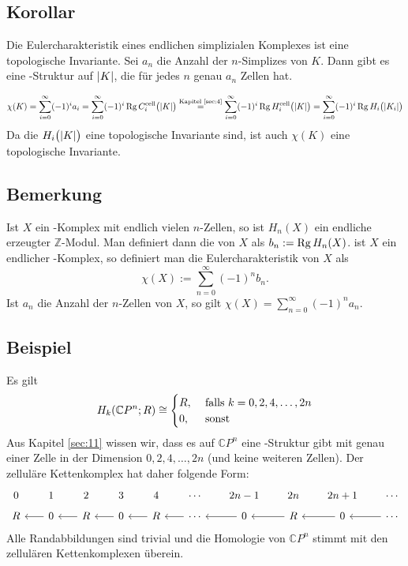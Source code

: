\subsection{Korollar} %
\label{sub:1210}
Die Eulercharakteristik eines endlichen simplizialen Komplexes ist eine topologische Invariante.
Sei $a_n$ die Anzahl der $n$-Simplizes von $K$. Dann gibt es eine \CW-Struktur auf $\abs*{K}$, die für jedes $n$ genau $a_n$ Zellen hat. 

\[
	\chi(K) = \sum_{i=0}^{\infty} (-1)^i a_i = \sum_{i=0}^{\infty} (-1)^i \Rg C_i^{\cell} \enbrace[\big]{\abs*{K}} \stackrel{\text{Kapitel \ref{sec:4}}}{=}
	\sum_{i=0}^{\infty} (-1)^i \Rg H_i^{\cell} \enbrace[\big]{\abs*{K}} = \sum_{i=0}^{\infty} (-1)^i \Rg H_i \enbrace[\big]{\abs*{K_i} }    
\]
Da die $H_i \enbrace[\big]{\abs*{K} } $ eine topologische Invariante sind, ist auch $\chi(K)$ eine topologische Invariante. \bewende

\subsection[Bemerkung: $n$-te Bettizahl]{Bemerkung} %
\label{sub:1211}
Ist $X$ ein \CW-Komplex mit endlich vielen $n$-Zellen, so ist $H_n(X)$ ein endliche erzeugter $\mathds{Z}$-Modul. Man definiert dann die  von $X$ als $b_n := \Rg H_n(X)$. ist $X$ ein endlicher \CW-Komplex, so definiert man die Eulercharakteristik von $X$ als
\[
	\chi(X) := \sum_{n=0}^{\infty} (-1)^{n} b_n.
\]
Ist $a_n$ die Anzahl der $n$-Zellen von $X$, so gilt $\chi(X)=\sum_{n=0}^{\infty} (-1)^n a_n$.

\subsection[Beispiel: Homologie von $\mathds{C}P^n$]{Beispiel} %
\label{sub:1212}
Es gilt 
\[
	H_k \enbrace*{\mathds{C}P^n;R} \cong  \begin{cases}
		R, &\text{ falls }k=0,2,4,\ldots ,2n\\
		0 ,&\text{ sonst}
	\end{cases}
\]
Aus Kapitel \ref{sec:11} wissen wir, dass es auf $\mathds{C}P^n$ eine \CW-Struktur gibt mit genau einer Zelle in der Dimension $0,2,4, \ldots ,2n$ (und keine weiteren 
Zellen). Der zelluläre Kettenkomplex hat daher folgende Form:
\[
	\begin{tikzcd}[row sep=tiny, column sep=scriptsize]
		0 & 1 & 2 & 3 & 4 & \cdots & 2n-1 & 2n & 2n +1 & \cdots \\
		R & 0 \lar & R \lar& 0 \lar & R \lar & \cdots \lar & 0 \lar& R \lar & 0 \lar & \cdots \lar
	\end{tikzcd}
\]
Alle Randabbildungen sind trivial und die Homologie von $\mathds{C}P^n$ stimmt mit den zellulären Kettenkomplexen überein. \bewende

